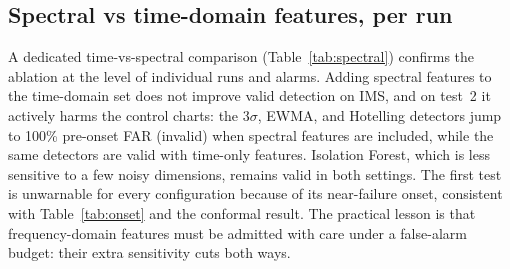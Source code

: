 \documentclass[journal]{IEEEtran}
\begin{document}
\subsection{Spectral vs time-domain features, per run}
A dedicated time-vs-spectral comparison (Table~\ref{tab:spectral}) confirms the
ablation at the level of individual runs and alarms. Adding spectral features to
the time-domain set does not improve valid detection on IMS, and on test~2 it
actively harms the control charts: the 3$\sigma$, EWMA, and Hotelling detectors
jump to 100\% pre-onset FAR (invalid) when spectral features are included, while
the same detectors are valid with time-only features. Isolation Forest, which is
less sensitive to a few noisy dimensions, remains valid in both settings. The
first test is unwarnable for every configuration because of its near-failure
onset, consistent with Table~\ref{tab:onset} and the conformal result. The
practical lesson is that frequency-domain features must be admitted with care
under a false-alarm budget: their extra sensitivity cuts both ways.
\end{document}
